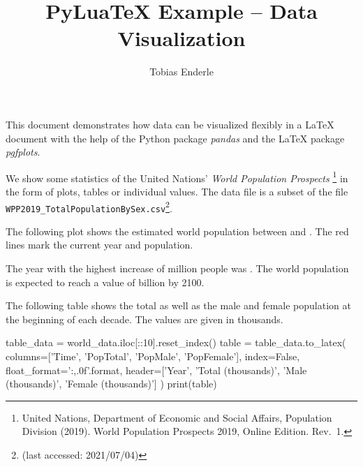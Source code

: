 \documentclass{article}
\title{PyLuaTeX Example -- Data Visualization}
\author{Tobias Enderle}
\begin{document}
\maketitle

This document demonstrates how data can be visualized flexibly in a \LaTeX{}
document with the help of the Python package \emph{pandas} and the \LaTeX{}
package \emph{pgfplots}.

We show some statistics of the United Nations' \emph{World Population Prospects}%
\footnote{United Nations, Department of Economic and Social Affairs, Population
Division (2019). World Population Prospects 2019, Online Edition. Rev.\ 1.} in the
form of plots, tables or individual values.
The data file \texttt{} is a subset of the file
\texttt{WPP2019\_TotalPopulationBySex.csv}\footnote{\dataurl{} (last accessed:
2021/07/04)}.

The following plot shows the estimated world population between 
and . The red lines mark the current year and population.

\begin{center}
\end{center}

The year with the highest increase of  million people
was . The world population is expected to reach a value
of  billion by 2100.

The following table shows the total as well as the male and female population at
the beginning of each decade. The values are given in thousands.
\begin{center}
\begin{python}
table_data = world_data.iloc[::10].reset_index()
table = table_data.to_latex(
    columns=['Time', 'PopTotal', 'PopMale', 'PopFemale'],
    index=False,
    float_format='{:,.0f}'.format,
    header=['Year', 'Total (thousands)', 'Male (thousands)', 'Female (thousands)']
)
print(table)
\end{python}
\end{center}
\end{document}

